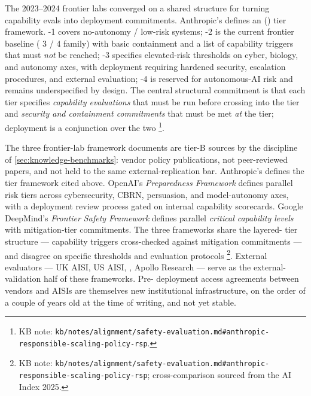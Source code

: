 The 2023--2024 frontier labs converged on a shared structure for
turning capability evals into deployment commitments. Anthropic's
\emph{} \citep{anthropic-rsp-2024}
defines an  () tier framework. -1 covers
no-autonomy / low-risk systems; -2 is the current frontier
baseline ( 3 /  4 family) with basic containment and a
list of capability triggers that must \emph{not} be reached; -3
specifies elevated-risk thresholds on cyber, biology, and autonomy
axes, with deployment requiring hardened security, escalation
procedures, and external evaluation; -4 is reserved for
autonomous-AI risk and remains underspecified by design. The
central structural commitment is that each tier specifies
\emph{capability evaluations} that must be run before crossing into
the tier and \emph{security and containment commitments} that must be
met \emph{at} the tier; deployment is a conjunction over the two%
\footnote{KB note: \nolinkurl{kb/notes/alignment/safety-evaluation.md#anthropic-responsible-scaling-policy-rsp}.}.

\begin{forumsignal}
The three frontier-lab framework documents are tier-B sources by the
discipline of \cref{sec:knowledge-benchmarks}: vendor policy
publications, not peer-reviewed papers, and not held to the same
external-replication bar. Anthropic's 
\citep{anthropic-rsp-2024} defines the  tier framework cited
above. OpenAI's \emph{Preparedness Framework}
defines parallel risk tiers across cybersecurity, CBRN, persuasion,
and model-autonomy axes, with a deployment review process gated on
internal capability scorecards. Google DeepMind's \emph{Frontier
Safety Framework}
defines parallel \emph{critical capability levels} with
mitigation-tier commitments. The three frameworks share the layered-
tier structure --- capability triggers cross-checked against
mitigation commitments --- and disagree on specific thresholds and
evaluation protocols%
\footnote{KB note: \nolinkurl{kb/notes/alignment/safety-evaluation.md#anthropic-responsible-scaling-policy-rsp}; cross-comparison sourced from the AI Index 2025.}.
External evaluators --- UK AISI, US AISI, , Apollo Research ---
serve as the external-validation half of these frameworks. Pre-
deployment access agreements between vendors and AISIs are themselves
new institutional infrastructure, on the order of a couple of years
old at the time of writing, and not yet stable.
\end{forumsignal}

